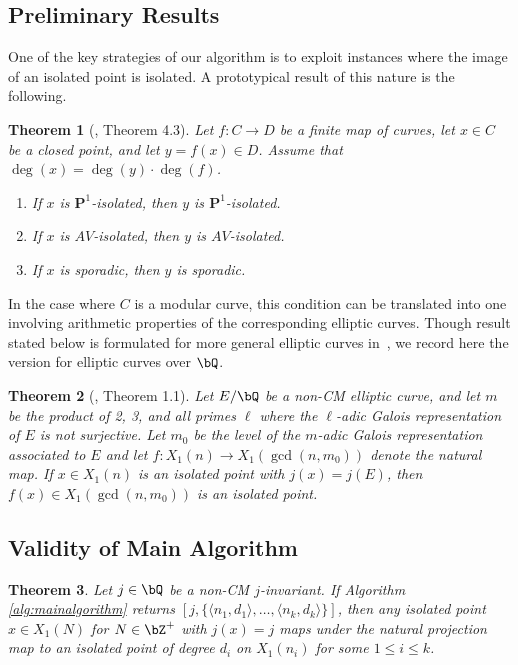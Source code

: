 \documentclass[11pt,reqno]{amsart}
\theoremstyle{plain}
\newtheorem{theorem}{Theorem}%
\theoremstyle{definition}
\newcommand{\Q}{\bQ}
\newcommand{\Z}{\bZ}
\newcommand{\PP}{\mathbf P}
\begin{document}
\subsection{Preliminary Results}
\label{sec:prelimresult}
One of the key strategies of our algorithm is to exploit instances where the image of an isolated point is isolated. A prototypical result of this nature is the following.
\begin{theorem}[\cite{BELOV}, Theorem 4.3]
\label{thm:PushingForwardSporadicIsolated}
    Let $f\colon C \to D$ be a finite map of curves, let $x\in C$ be a closed point, and let $y = f(x) \in D$.  Assume that $\deg(x) = \deg(y)\cdot\deg(f)$.
    \begin{enumerate}
        \item If $x$ is $\PP^1$-isolated, then $y$ is $\PP^1$-isolated.
                \item If $x$ is $AV$-isolated, then $y$ is $AV$-isolated.
        \item If $x$ is sporadic, then $y$ is sporadic.
    \end{enumerate}
\end{theorem}

In the case where $C$ is a modular curve, this condition can be translated into one involving arithmetic properties of the corresponding elliptic curves. Though result stated below is formulated for more general elliptic curves in~\cite{BELOV}, we record here the version for elliptic curves over $\Q$.

\begin{theorem}[\cite{BELOV}, Theorem 1.1]\label{BELOVthm}
Let $E/\Q$ be a non-CM elliptic curve, and let $m$ be the product of 2, 3, and all primes $\ell$ where the $\ell$-adic Galois representation of $E$ is not surjective. Let $m_0$ be the level of the $m$-adic Galois representation associated to $E$ and let $f\colon X_1(n) \rightarrow X_1(\gcd(n,m_0))$ denote the natural map. If $x\in X_1(n)$ is an isolated point with $j(x)=j(E)$, then $f(x)\in X_1(\gcd(n,m_0))$ is an isolated point.
\end{theorem}

\subsection{Validity of Main Algorithm}
\label{sec:proofvalidity}
\begin{theorem}\label{thm:validity_main_algorithm}
Let $j\in\Q$ be a non-CM $j$-invariant. If Algorithm \ref{alg:mainalgorithm} returns $[j,\{\langle n_1,d_1\rangle, \dots, \langle n_k,d_k\rangle \}]$, then any isolated point $x\in X_1(N)$ for $N \in \Z^+$ with $j(x)=j$ maps under the natural projection map to an isolated point of degree $d_i$ on $X_1(n_i)$ for some  $1 \leq i \leq k$.
\end{theorem}
\end{document}
